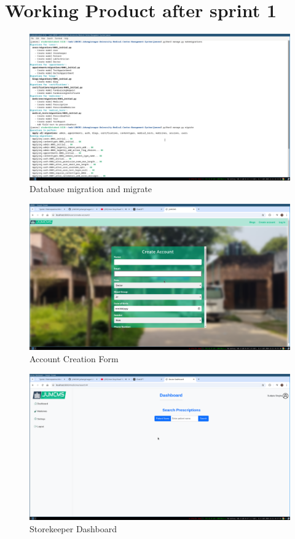 \documentclass[a4paper,12pt]{article}
\begin{document}
\section{Working Product after sprint 1}
\begin{figure}[H]
    \centering
    \includegraphics[width=\textwidth]{spr1output1.png}
    \caption{Database migration and migrate}
\end{figure}

\begin{figure}[H]
    \centering
    \includegraphics[width=\textwidth]{spr1output2.png}
    \caption{Account Creation Form}
\end{figure}

\begin{figure}[H]
    \centering
    \includegraphics[width=\textwidth]{spr1output3.png}
    \caption{Storekeeper Dashboard}
\end{figure}
\end{document}
